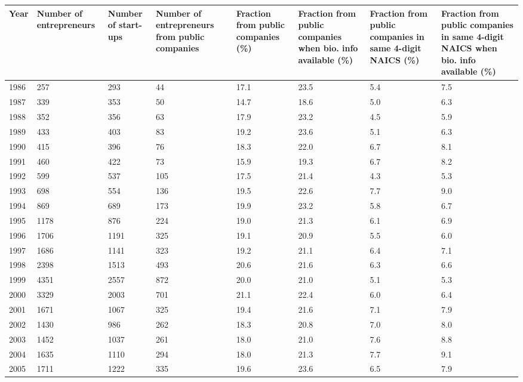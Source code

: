\begin{table}[!htb]
\centering
\begingroup\scriptsize
\begin{tabular}{p{1.75cm}p{1.75cm}p{1.75cm}p{1.75cm}p{1.75cm}p{1.75cm}p{1.75cm}p{1.75cm}}
  \toprule
Year & Number of entrepreneurs & Number of start-ups & Number of entrepreneurs from public companies & Fraction from public companies (\%) & Fraction from public companies when bio. info available (\%) & Fraction from public companies in same 4-digit NAICS (\%) & Fraction from public companies in same 4-digit NAICS when bio. info available (\%) \\ 
  \midrule
1986 & 257 & 293 & 44 & 17.1 & 23.5 & 5.4 & 7.5 \\ 
  1987 & 339 & 353 & 50 & 14.7 & 18.6 & 5.0 & 6.3 \\ 
  1988 & 352 & 356 & 63 & 17.9 & 23.2 & 4.5 & 5.9 \\ 
  1989 & 433 & 403 & 83 & 19.2 & 23.6 & 5.1 & 6.3 \\ 
  1990 & 415 & 396 & 76 & 18.3 & 22.0 & 6.7 & 8.1 \\ 
  1991 & 460 & 422 & 73 & 15.9 & 19.3 & 6.7 & 8.2 \\ 
  1992 & 599 & 537 & 105 & 17.5 & 21.4 & 4.3 & 5.3 \\ 
  1993 & 698 & 554 & 136 & 19.5 & 22.6 & 7.7 & 9.0 \\ 
  1994 & 869 & 689 & 173 & 19.9 & 23.2 & 5.8 & 6.7 \\ 
  1995 & 1178 & 876 & 224 & 19.0 & 21.3 & 6.1 & 6.9 \\ 
  1996 & 1706 & 1191 & 325 & 19.1 & 20.9 & 5.5 & 6.0 \\ 
  1997 & 1686 & 1141 & 323 & 19.2 & 21.1 & 6.4 & 7.1 \\ 
  1998 & 2398 & 1513 & 493 & 20.6 & 21.6 & 6.3 & 6.6 \\ 
  1999 & 4351 & 2557 & 872 & 20.0 & 21.0 & 5.1 & 5.3 \\ 
  2000 & 3329 & 2003 & 701 & 21.1 & 22.4 & 6.0 & 6.4 \\ 
  2001 & 1671 & 1067 & 325 & 19.4 & 21.6 & 7.1 & 7.9 \\ 
  2002 & 1430 & 986 & 262 & 18.3 & 20.8 & 7.0 & 8.0 \\ 
  2003 & 1452 & 1037 & 261 & 18.0 & 21.0 & 7.6 & 8.8 \\ 
  2004 & 1635 & 1110 & 294 & 18.0 & 21.3 & 7.7 & 9.1 \\ 
  2005 & 1711 & 1222 & 335 & 19.6 & 23.6 & 6.5 & 7.9 \\ 

\end{tabular}
\end{table}
